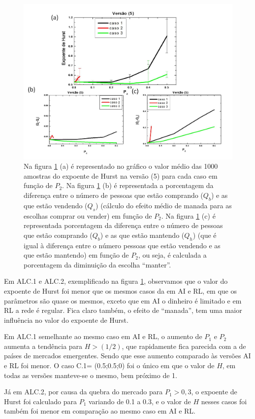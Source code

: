 \documentclass[brazil,ruledheader]{abnt}
\begin{document}
\begin{figure}[!h]
\centering
\includegraphics[width=.7\linewidth]{Figuras/36.jpg}
\caption{Na figura \ref{fig:grafico5} (a) é representado no gráfico o valor
médio das 1000 amostras do expoente de Hurst na versão (5) para cada caso em
função de $P_2$. Na figura \ref{fig:grafico5} (b) é representada a porcentagem
 da diferença entre o número de pessoas que estão
comprando ($Q_b$) e as que estão vendendo ($Q_s$) (cálculo do efeito médio de
manada para as escolhas comprar ou vender) em função de $P_2$. Na figura
\ref{fig:grafico5} (c) é representada porcentagem  da
diferença entre o número de pessoas que estão comprando ($Q_b$) e as que estão
mantendo ($Q_h$) (que é igual à diferença entre o número pessoas que estão
vendendo e as que estão mantendo) em função de $P_2$, ou seja, é calculada a
porcentagem da diminuição da escolha ``manter''.}
\label{fig:grafico5}
\end{figure}

Em ALC.1 e ALC.2, exemplificado na figura \ref{fig:grafico5},
observamos que o valor do expoente de Hurst foi menor que os mesmos casos da
em AI e RL, em que os parâmetros são quase os mesmos, exceto que em
AI o dinheiro é limitado e em RL a rede é regular. Fica claro também, o efeito
de ``manada'', tem uma maior influência no valor do expoente de Hurst. 

Em ALC.1 semelhante ao mesmo caso em AI e RL,
o aumento de $P_1$ e $P_2$ aumenta a tendência para $H>(1/2)$, que rapidamente
fica parecida com a de países de mercados emergentes. Sendo que esse aumento
comparado às
versões AI e RL foi menor. O caso C.1= (0.5;0.5;0) foi o único em que o valor de
$H$, em todas as versões manteve-se o mesmo, bem próximo de 1.  

Já em ALC.2, por causa da quebra do mercado para $P_1>0,3$, o 
expoente de Hurst foi calculado para $P_1$ variando de 0.1 a 0.3, e o valor de
$H$ nesses casos foi  também foi menor em comparação ao mesmo caso em AI e RL. 
  
\end{document}
